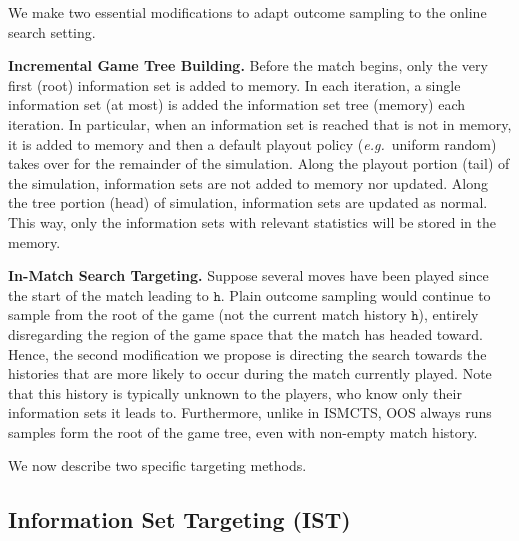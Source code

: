 \documentclass{aamas2015}
\newcommand{\tth}{\mathtt{h}}
\newcommand{\defword}[1]{\textbf{\boldmath{#1}}}
\newcommand{\eg}{{\it e.g.}~}
\begin{document}
We make two essential modifications to adapt outcome sampling to the online search setting.

{\bf Incremental Game Tree Building.} Before the match begins, only the very first (root) information set is added to memory. 
In each iteration, a single information set (at most) is added the information set tree (memory) each iteration.
In particular, when an information set is reached that is not in memory, it is added to memory and then a default 
playout policy (\eg uniform random) takes over for the remainder of the simulation.
Along the playout portion (tail) of the simulation, information sets are not added to memory nor updated.
Along the tree portion (head) of simulation, information sets are updated as normal. 
This way, only the information sets with relevant statistics will be stored in the memory.

{\bf In-Match Search Targeting.}
Suppose several moves have been played since the start of the match leading to $\tth$. 
Plain outcome sampling would continue to sample from the root of the game (not the current match history $\tth$), entirely 
disregarding the region of the game space that the match has headed toward. 
Hence, the second modification we propose is directing the search towards the histories that are more likely to occur during the match currently played.
Note that this history is typically unknown to the players, who know only their information sets it leads to. 
Furthermore, unlike in ISMCTS, OOS always runs samples form the root of the game tree, even with non-empty match history.

We now describe two specific targeting methods.

\subsection{Information Set Targeting (IST)}
\end{document}

